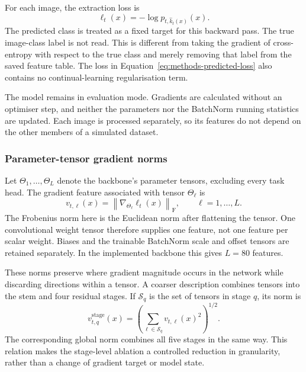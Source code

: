 For each image, the extraction loss is
\begin{equation}
    \ell_t(x)=-\log p_{t,\widehat{k}_t(x)}(x).
    \label{eq:methods-predicted-loss}
\end{equation}
The predicted class is treated as a fixed target for this backward pass.
The true image-class label is not read. This is different from taking the
gradient of cross-entropy with respect to the true class and merely removing
that label from the saved feature table. The loss in
Equation~\eqref{eq:methods-predicted-loss} also contains no continual-learning
regularisation term.

The model remains in evaluation mode. Gradients are calculated without an
optimiser step, and neither the parameters nor the BatchNorm running
statistics are updated. Each image is processed separately, so its features
do not depend on the other members of a simulated dataset.

\subsubsection{Parameter-tensor gradient norms}

Let $\Theta_1,\ldots,\Theta_L$ denote the backbone's parameter tensors,
excluding every task head. The gradient feature associated with tensor
$\Theta_\ell$ is
\begin{equation}
    v_{t,\ell}(x)=
    \left\|\nabla_{\Theta_\ell}\ell_t(x)\right\|_{\mathrm{F}},
    \qquad \ell=1,\ldots,L.
    \label{eq:methods-tensor-norm}
\end{equation}
The Frobenius norm here is the Euclidean norm after flattening the tensor.
One convolutional weight tensor therefore supplies one feature, not one
feature per scalar weight. Biases and the trainable BatchNorm scale and
offset tensors are retained separately. In the implemented backbone this
gives $L=80$ features.

These norms preserve where gradient magnitude occurs in the network while
discarding directions within a tensor. A coarser description combines
tensors into the stem and four residual stages. If $\mathcal{S}_q$ is the
set of tensors in stage $q$, its norm is
\begin{equation}
    v^{\mathrm{stage}}_{t,q}(x)=
    \left(\sum_{\ell\in\mathcal{S}_q}v_{t,\ell}(x)^2\right)^{1/2}.
    \label{eq:methods-stage-norm}
\end{equation}
The corresponding global norm combines all five stages in the same way.
This relation makes the stage-level ablation a controlled reduction in
granularity, rather than a change of gradient target or model state.

